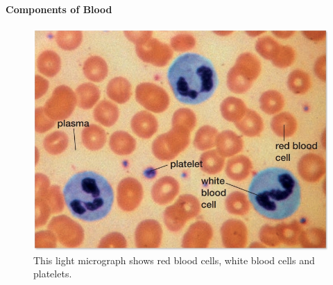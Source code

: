 \paragraph{Components of Blood}
\begin{figure}[H]
    \centering
    \includegraphics[scale=0.25]{Biology/1B/Images/1B-2-1.png}
    \caption{This light micrograph shows red blood cells, white blood cells and platelets.}
\end{figure}

